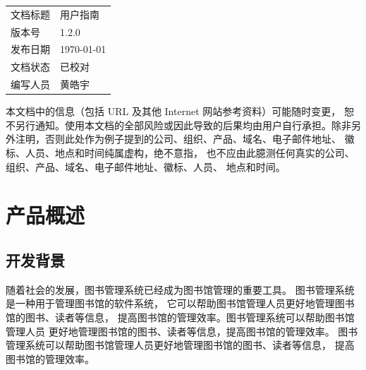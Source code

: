 \documentclass[12pt,twoside]{ctexart}
\begin{document}
\setcounter{page}{0}
\thispagestyle{empty} %

\begin{center}
    \vspace*{\fill} %
    {\large
        \begin{tabular}{ll}
            文档标题 & 用户指南   \\
            版本号  & 1.2.0  \\
            发布日期 & \today \\
            文档状态 & 已校对    \\
            编写人员 & 黄皓宇    \\
        \end{tabular}
    }

\end{center}

\vspace*{\fill} %

\vspace{4cm} %
{\small 本文档中的信息（包括 URL 及其他 Internet 网站参考资料）可能随时变更，
    恕不另行通知。使用本文档的全部风险或因此导致的后果均由用户自行承担。除非另外注明，否则此处作为例子提到的公司、组织、产品、域名、电子邮件地址、
    徽标、人员、地点和时间纯属虚构，绝不意指，
    也不应由此臆测任何真实的公司、组织、产品、域名、电子邮件地址、徽标、人员、
    地点和时间。\par}




\newpage
\setcounter{page}{1}

\tableofcontents
\newpage

\section{产品概述}
\subsection{开发背景}
随着社会的发展，图书管理系统已经成为图书馆管理的重要工具。
图书管理系统是一种用于管理图书馆的软件系统，
它可以帮助图书馆管理人员更好地管理图书馆的图书、读者等信息，
提高图书馆的管理效率。图书管理系统可以帮助图书馆管理人员
更好地管理图书馆的图书、读者等信息，提高图书馆的管理效率。
图书管理系统可以帮助图书馆管理人员更好地管理图书馆的图书、读者等信息，
提高图书馆的管理效率。
\end{document}
